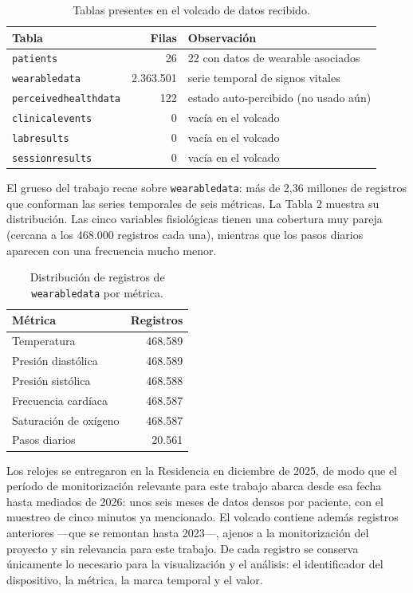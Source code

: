 \begin{table}[h!]
\centering
\begin{tabular}{lrl}
\hline
Tabla & Filas & Observación \\
\hline
\texttt{patients} & 26 & 22 con datos de wearable asociados \\
\texttt{wearabledata} & 2.363.501 & serie temporal de signos vitales \\
\texttt{perceivedhealthdata} & 122 & estado auto-percibido (no usado aún) \\
\texttt{clinicalevents} & 0 & vacía en el volcado \\
\texttt{labresults} & 0 & vacía en el volcado \\
\texttt{sessionresults} & 0 & vacía en el volcado \\
\hline
\end{tabular}
\caption{Tablas presentes en el volcado de datos recibido.}
\end{table}
El grueso del trabajo recae sobre \texttt{wearabledata}: más de 2,36 millones de registros que conforman las series temporales de seis métricas. La Tabla 2 muestra su distribución. Las cinco variables fisiológicas tienen una cobertura muy pareja (cercana a los 468.000 registros cada una), mientras que los pasos diarios aparecen con una frecuencia mucho menor.\\


\begin{table}[h!]
\centering
\begin{tabular}{lr}
\hline
Métrica & Registros \\
\hline
Temperatura & 468.589 \\
Presión diastólica & 468.589 \\
Presión sistólica & 468.588 \\
Frecuencia cardíaca & 468.587 \\
Saturación de oxígeno & 468.587 \\
Pasos diarios & 20.561 \\
\hline
\end{tabular}
\caption{Distribución de registros de \texttt{wearabledata} por métrica.}
\end{table}
Los relojes se entregaron en la Residencia en diciembre de 2025, de modo que el período de monitorización relevante para este trabajo abarca desde esa fecha hasta mediados de 2026: unos seis meses de datos densos por paciente, con el muestreo de cinco minutos ya mencionado. El volcado contiene además registros anteriores —que se remontan hasta 2023—, ajenos a la monitorización del proyecto y sin relevancia para este trabajo. De cada registro se conserva únicamente lo necesario para la visualización y el análisis: el identificador del dispositivo, la métrica, la marca temporal y el valor.\\


